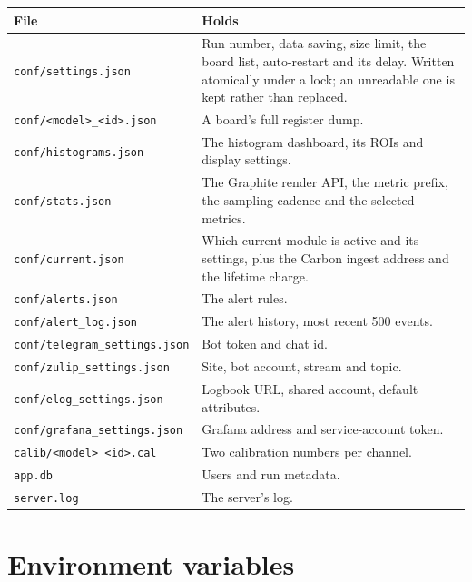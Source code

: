 \documentclass[11pt,a4paper]{report}
\newcommand{\file}[1]{\texttt{#1}}
\begin{document}
\begin{center}
\begin{longtable}{@{}L{0.34\textwidth}L{0.58\textwidth}@{}}
\toprule
\textbf{File} & \textbf{Holds} \\
\midrule
\endhead
\file{conf/settings.json} & Run number, data saving, size limit, the board list,
auto-restart and its delay. Written atomically under a lock; an unreadable one is
kept rather than replaced. \\
\file{conf/<model>\_<id>.json} & A board's full register dump. \\
\file{conf/histograms.json} & The histogram dashboard, its ROIs and display
settings. \\
\file{conf/stats.json} & The Graphite render API, the metric prefix, the sampling
cadence and the selected metrics. \\
\file{conf/current.json} & Which current module is active and its settings, plus
the Carbon ingest address and the lifetime charge. \\
\file{conf/alerts.json} & The alert rules. \\
\file{conf/alert\_log.json} & The alert history, most recent 500 events. \\
\file{conf/telegram\_settings.json} & Bot token and chat id. \\
\file{conf/zulip\_settings.json} & Site, bot account, stream and topic. \\
\file{conf/elog\_settings.json} & Logbook URL, shared account, default
attributes. \\
\file{conf/grafana\_settings.json} & Grafana address and service-account token. \\
\file{calib/<model>\_<id>.cal} & Two calibration numbers per channel. \\
\file{app.db} & Users and run metadata. \\
\file{server.log} & The server's log. \\
\bottomrule
\end{longtable}
\end{center}

\chapter{Environment variables}
\end{document}
